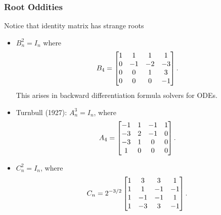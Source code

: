 \documentclass{article}
\begin{document}
\subsubsection{Root Oddities}
Notice that identity matrix has strange roots
\begin{itemize}
    \item $B_n^2 = I_n$ where 
    \begin{equation}\notag
        B_4 = \begin{bmatrix}
            1 & 1 & 1 & 1 \\ 0 & -1 & -2 & -3 \\
            0 & 0 & 1 & 3 \\ 0 & 0 & 0 & -1 
        \end{bmatrix}.
    \end{equation}
    This arises in backward differentiation formula solvers for ODEs.
    \item Turnbull (1927): $A^3_n = I_n$, where 
    \begin{equation}\notag
        A_4 = 
        \begin{bmatrix}
            -1 & 1 & -1 & 1 \\ -3 & 2 & -1 & 0 \\ -3 & 1 & 0 & 0 \\
            1 & 0 & 0 & 0
        \end{bmatrix}.
    \end{equation}
    \item $C_n^2 = I_n$, where
    \begin{equation}\notag
        C_n = 2^{-3/2}
        \begin{bmatrix}
            1 & 3 & 3 & 1 \\ 1 & 1 & -1 & -1 \\ 1 & -1 & -1 & 1 \\ 
            1 & -3 & 3 & -1
        \end{bmatrix}.
    \end{equation}
\end{itemize}
\end{document}
